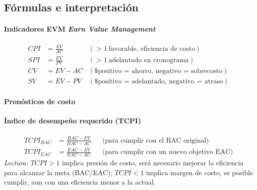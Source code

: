 \documentclass[12pt]
{charter}
\begin{document}
\FloatBarrier

\subsection*{Fórmulas e interpretación}

\paragraph{Indicadores EVM \textit{Earn Value Management}}
\[
\begin{aligned}
CPI &= \frac{EV}{AC} \quad & (>1\ \text{favorable, eficiencia de costo})\\
SPI &= \frac{EV}{PV} \quad & (>1\ \text{adelantado en cronograma})\\[2pt]
CV  &= EV - AC              & (\text{\$ positivo = ahorro, negativo = sobrecosto})\\
SV  &= EV - PV              & (\text{\$ positivo = adelantado, negativo = atraso})
\end{aligned}
\]

\paragraph{Pronósticos de costo}
\begin{table}[h]
\centering
{}
\end{table}


\paragraph{Índice de desempeño requerido (TCPI)}
\[
\begin{aligned}
TCPI_{BAC} &= \frac{BAC - EV}{BAC - AC}
&& \text{(para cumplir con el BAC original)}\\
TCPI_{EAC} &= \frac{EAC - EV}{EAC - AC}
&& \text{(para cumplir con un nuevo objetivo EAC)}
\end{aligned}
\]
\textit{Lectura:} $TCPI>1$ implica presión de costo, será necesario mejorar la eficiencia para alcanzar la meta (BAC/EAC); $TCPI<1$ implica margen de costo, es posible cumplir, aun con una eficiencia menor a la actual.
\end{document}
